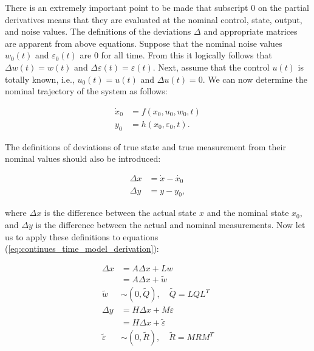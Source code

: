 There is an extremely important point to be made that subscript 0 on the partial derivatives means that they are evaluated at the nominal control, state, output, and noise values. The
definitions of the deviations \(\Delta\) and appropriate matrices are apparent from above equations. Suppose that the nominal noise values \(w_0(t)\) and \(\varepsilon_0(t)\) are 0 for all time.
From this it logically follows that \(\Delta w(t) = w(t)\) and \(\Delta \varepsilon(t) = \varepsilon(t)\). Next, assume that the control \(u(t)\) is totally known, i.e., \(u_0(t) = u(t)\) and \(\Delta u(t) = 0\). We can now determine the nominal trajectory of the system as follows:

\begin{equation}
\begin{aligned}
\dot{x}_0 &=f\left(x_0, u_0, w_0, t\right) \\
y_0 &=h\left(x_0, \varepsilon_0, t\right).
\end{aligned}
\end{equation}

The definitions of deviations of true state and true measurement from their nominal values should also be introduced:

\begin{equation}
\begin{aligned}
\Delta x &=\dot{x}-\dot{x_0} \\
\Delta y &=y-y_0,
\end{aligned}
\end{equation}

\noindent where \(\Delta x\) is the difference between the actual state \(x\) and the nominal state \(x_0\), and \(\Delta y\) is the difference between the actual and nominal measurements. Now let us to apply these definitions to  equations (\ref{eq:continues_time_model_derivation}):

\begin{equation}
\begin{aligned}
\Delta x &=A \Delta x+L w \\
&=A \Delta x+\tilde{w} \\
\tilde{w} & \sim(0, \tilde{Q}), \quad \tilde{Q}=L Q L^T \\
\Delta y &=H \Delta x+M \varepsilon \\
&=H \Delta x+\tilde{\varepsilon} \\
\tilde{\varepsilon} & \sim(0, \tilde{R}), \quad \tilde{R}=M R M^T
\end{aligned}
\end{equation}

